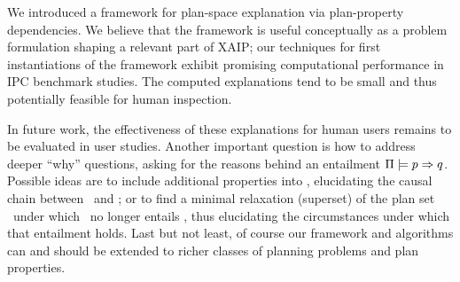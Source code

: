 We introduced a framework for plan-space explanation via plan-property
dependencies. We believe that the framework is useful conceptually as
a problem formulation shaping a relevant part of XAIP; our techniques
for first instantiations of the framework exhibit promising
computational performance in IPC benchmark studies. The computed
explanations tend to be small and thus potentially feasible for human
inspection.



%
%
%

In future work, the effectiveness of these explanations for human
users remains to be evaluated in user studies. Another important
question is how to address deeper ``why'' questions, asking for the
reasons behind an entailment
$\Pi \models p \Rightarrow q$. Possible ideas are to include
additional properties into \props, elucidating the causal chain
between \prop\ and \propq; or to find a minimal relaxation (superset)
of the plan set \plans\ under which \prop\ no longer entails \propq,
thus elucidating the circumstances under which that entailment
holds. Last but not least, of course our framework and algorithms can
and should be extended to richer classes of planning problems and plan
properties.



